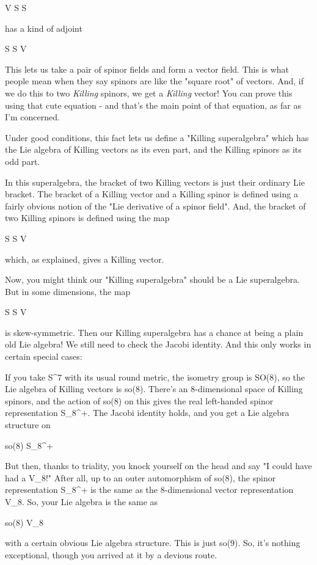 V \otimes  S \to  S

has a kind of adjoint

S \otimes  S \to  V

This lets us take a pair of spinor fields and form a vector
field.  This is what people mean when they say spinors are 
like the "square root" of vectors.  And, if we do this to 
two \emph{Killing} spinors, we get a \emph{Killing} vector!  You can 
prove this using that cute equation - and that's the main point 
of that equation, as far as I'm concerned. 

Under good conditions, this fact lets us define a "Killing 
superalgebra" which has the Lie algebra of Killing vectors 
as its even part, and the Killing spinors as its odd part.

In this superalgebra, the bracket of two Killing vectors 
is just their ordinary Lie bracket.  The bracket of a Killing 
vector and a Killing spinor is defined using a fairly obvious
notion of the "Lie derivative of a spinor field".  And, the 
bracket of two Killing spinors is defined using the map 

S \otimes  S \to  V

which, as explained, gives a Killing vector. 

Now, you might think our "Killing superalgebra" should be a
Lie superalgebra.  But in some dimensions, the map

S \otimes  S \to  V

is skew-symmetric.  Then our Killing superalgebra has a chance
at being a plain old Lie algebra!  We still need to check 
the Jacobi identity.  And this only works in certain special cases:

If you take S^{7} with its usual round metric, the isometry
group is SO(8), so the Lie algebra of Killing vectors is so(8).
There's an 8-dimensional space of Killing spinors, and the action of
so(8) on this gives the real left-handed spinor representation
S_{8}^{+}.  The Jacobi identity holds, and you 
get a Lie algebra structure on

so(8) \oplus  S_{8}^{+} 

But then, thanks to triality, you knock yourself on the head and say
"I could have had a V_{8}!" After all, up to an
outer automorphism of so(8), the spinor representation
S_{8}^{+} is the same as the 8-dimensional vector
representation V_{8}.  So, your Lie algebra is the same as

so(8) \oplus  V_{8} 

with a certain obvious Lie algebra structure.  This is just so(9).
So, it's nothing exceptional, though you arrived at it by a 
devious route.

